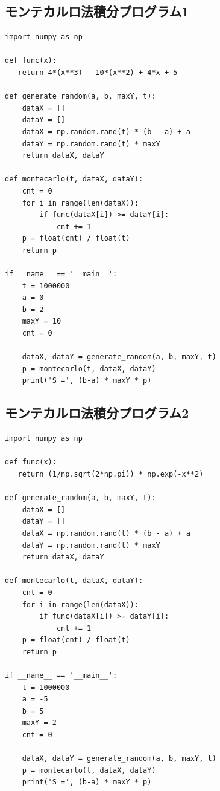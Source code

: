 \documentclass[a4paper, titlepage]{jsarticle}
\begin{document}
	\subsection{モンテカルロ法積分プログラム1}
		\begin{lstlisting}
import numpy as np

def func(x):
   return 4*(x**3) - 10*(x**2) + 4*x + 5

def generate_random(a, b, maxY, t):
    dataX = []
    dataY = []
    dataX = np.random.rand(t) * (b - a) + a
    dataY = np.random.rand(t) * maxY
    return dataX, dataY

def montecarlo(t, dataX, dataY):
    cnt = 0
    for i in range(len(dataX)):
        if func(dataX[i]) >= dataY[i]:
            cnt += 1
    p = float(cnt) / float(t)
    return p

if __name__ == '__main__':
    t = 1000000
    a = 0
    b = 2
    maxY = 10
    cnt = 0

    dataX, dataY = generate_random(a, b, maxY, t)
    p = montecarlo(t, dataX, dataY)
    print('S =', (b-a) * maxY * p)
		\end{lstlisting}

	\subsection{モンテカルロ法積分プログラム2}
		\begin{lstlisting}
import numpy as np

def func(x):
   return (1/np.sqrt(2*np.pi)) * np.exp(-x**2)

def generate_random(a, b, maxY, t):
    dataX = []
    dataY = []
    dataX = np.random.rand(t) * (b - a) + a
    dataY = np.random.rand(t) * maxY
    return dataX, dataY

def montecarlo(t, dataX, dataY):
    cnt = 0
    for i in range(len(dataX)):
        if func(dataX[i]) >= dataY[i]:
            cnt += 1
    p = float(cnt) / float(t)
    return p

if __name__ == '__main__':
    t = 1000000
    a = -5
    b = 5
    maxY = 2
    cnt = 0

    dataX, dataY = generate_random(a, b, maxY, t)
    p = montecarlo(t, dataX, dataY)
    print('S =', (b-a) * maxY * p)
		\end{lstlisting}
\end{document}
